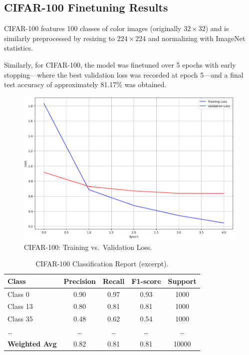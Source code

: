 \documentclass[conference]{IEEEtran}
\begin{document}
\subsection{CIFAR-100 Finetuning Results}
CIFAR-100 features 100 classes of color images (originally $32\times32$)
\cite{cifar} and is similarly preprocessed by resizing to $224\times224$ and
normalizing with ImageNet statistics.

Similarly, for CIFAR-100, the model was finetuned over 5 epochs with early
stopping—where the best validation loss was recorded at epoch 5—and a final
test accuracy of approximately 81.17\% was obtained.

\begin{figure}[H]
    \centering
    \includegraphics[width=0.55\linewidth]{cifar100_train_val_loss.png}
    \caption{CIFAR-100: Training vs.\ Validation Loss.}
    \label{fig:cifar100_loss}
\end{figure}

\begin{table}[H]
    \centering
    \scriptsize
    \begin{tabular}{lcccc}
        \toprule
        \textbf{Class}        & \textbf{Precision} & \textbf{Recall} & \textbf{F1-score} & \textbf{Support} \\
        \midrule
        Class 0               & 0.90               & 0.97            & 0.93              & 1000             \\
        Class 13              & 0.80               & 0.81            & 0.81              & 1000             \\
        Class 35              & 0.48               & 0.62            & 0.54              & 1000             \\
        \ldots                & \ldots             & \ldots          & \ldots            & \ldots           \\
        \midrule
        \textbf{Weighted Avg} & 0.82               & 0.81            & 0.81              & 10000            \\
        \bottomrule
    \end{tabular}
    \caption{CIFAR-100 Classification Report (excerpt).}
    \label{tab:cifar100_report}
\end{table}
\end{document}
